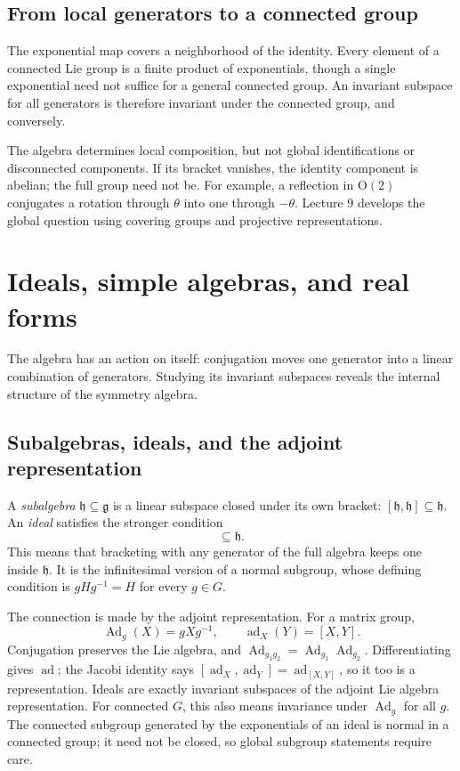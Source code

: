 \documentclass[11pt]{article}
\newcommand{\OO}{\mathrm{O}}
\newcommand{\Ad}{\operatorname{Ad}}
\newcommand{\ad}{\operatorname{ad}}
\newcommand{\lieg}{\mathfrak g}
\newcommand{\lieh}{\mathfrak h}
\begin{document}
\subsection{From local generators to a connected group}
The exponential map covers a neighborhood of the identity. Every element
of a connected Lie group is a finite product of exponentials, though a
single exponential need not suffice for a general connected group.
An invariant subspace for all generators is therefore invariant under
the connected group, and conversely.

The algebra determines local composition, but not global identifications
or disconnected components. If its bracket vanishes, the identity
component is abelian; the full group need not be. For example, a
reflection in \(\OO(2)\) conjugates a rotation through \(\theta\) into
one through \(-\theta\). Lecture 9 develops the global question using
covering groups and projective representations.

\section{Ideals, simple algebras, and real forms}
\label{sec:ideals}
The algebra has an action on itself: conjugation moves one generator
into a linear combination of generators. Studying its invariant
subspaces reveals the internal structure of the symmetry algebra.

\subsection{Subalgebras, ideals, and the adjoint representation}
A \emph{subalgebra} \(\lieh\subseteq\lieg\) is a linear subspace closed
under its own bracket: \([\lieh,\lieh]\subseteq\lieh\).
An \emph{ideal} satisfies the stronger condition
\begin{equation}
 [\lieg,\lieh]\subseteq\lieh.
 \label{eq:ideal}
\end{equation}
This means that bracketing with any generator of the full algebra keeps
one inside \(\lieh\). It is the infinitesimal version of a normal subgroup,
whose defining condition is \(gHg^{-1}=H\) for every \(g\in G\).

The connection is made by the adjoint representation. For a matrix group,
\begin{equation}
 \Ad_g(X)=gXg^{-1},\qquad \ad_X(Y)=[X,Y].
 \label{eq:adjoint}
\end{equation}
Conjugation preserves the Lie algebra, and
\(\Ad_{g_1g_2}=\Ad_{g_1}\Ad_{g_2}\). Differentiating gives \(\ad\);
the Jacobi identity says
\([\ad_X,\ad_Y]=\ad_{[X,Y]}\), so it too is a representation.
Ideals are exactly invariant subspaces of the adjoint Lie algebra
representation. For connected \(G\), this also means invariance under
\(\Ad_g\) for all \(g\). The connected subgroup generated by the
exponentials of an ideal is normal in a connected group; it need not be
closed, so global subgroup statements require care.
\end{document}
